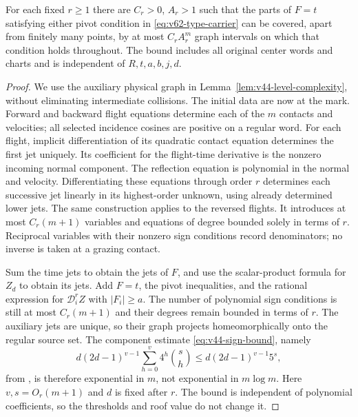 \begin{lemma}
\label{lem:v62-jet-complexity}
For each fixed $r\ge1$ there are $C_r>0$, $A_r>1$ such that the
parts of $F=t$ satisfying either pivot condition in
\eqref{eq:v62-type-carrier} can be covered, apart from finitely many
points, by at most $C_rA_r^m$ graph intervals on which that condition
holds throughout. The bound includes all original center words and
charts and is independent of $R,t,a,b,j,d$.
\end{lemma}
\begin{proof}
We use the auxiliary physical graph in
Lemma~\ref{lem:v44-level-complexity}, without eliminating intermediate
collisions. The initial data are now at the mark. Forward and backward
flight equations determine each of the $m$ contacts and velocities;
all selected incidence cosines are positive on a regular word.
For each flight, implicit differentiation of its quadratic contact
equation determines the first jet uniquely. Its coefficient for the
flight-time derivative is the nonzero incoming normal component.
The reflection equation is polynomial in the normal and velocity.
Differentiating these equations through order $r$ determines each
successive jet linearly in its highest-order unknown, using already
determined lower jets. The same construction applies to the reversed
flights. It introduces at most $C_r(m+1)$ variables and equations of
degree bounded solely in terms of $r$. Reciprocal variables with their
nonzero sign conditions record denominators; no inverse is taken at
a grazing contact.

Sum the time jets to obtain the jets of $F$, and use the scalar-product
formula for $Z_d$ to obtain its jets. Add $F=t$, the pivot inequalities,
and the rational expression for $\mathscr D_i^rZ$ with $|F_i|\ge a$.
The number of polynomial sign conditions is still at most $C_r(m+1)$
and their degrees remain bounded in terms of $r$. The auxiliary jets
are unique, so their graph projects homeomorphically onto the regular
source set. The component estimate \eqref{eq:v44-sign-bound}, namely
\[
 d(2d-1)^{v-1}\sum_{h=0}^{v}4^h\binom{s}{h}
       \le d(2d-1)^{v-1}5^s,
\]
from \cite[Section 3.2, equation (3.3)]{BPR}, is therefore exponential
in $m$, not exponential in $m\log m$. Here $v,s=O_r(m+1)$ and $d$
is fixed after $r$. The bound is independent of polynomial coefficients,
so the thresholds and roof value do not change it.


\end{proof}
